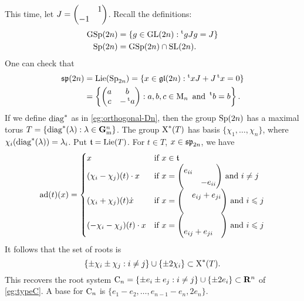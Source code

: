 \begin{example}[Symplectic]\label{eg:symplectic-root}
This time, let $J=\begin{pmatrix}  & 1 \\ -1 &  \end{pmatrix}$. Recall the definitions:
\begin{align*}
  \operatorname{GSp}(2n) &= \{g\in \operatorname{GL}(2n):\prescript{\mathrm{t}}{}{g} J g=J\} \\
  \operatorname{Sp}(2n) &= \operatorname{GSp}(2n)\cap \operatorname{SL}(2n) .
\end{align*}
One can check that 
\begin{align*}
  \mathfrak{sp}(2n)
    &= \operatorname{Lie}(\operatorname{Sp}_{2n}) = \{x\in \mathfrak{gl}(2n):\prescript{\mathrm{t}}{}{x} J + J\prescript{\mathrm{t}}{}{x}=0\} \\
    &= \left\{\begin{pmatrix} a & b \\ c & -\prescript{\mathrm{t}}{}{a} \end{pmatrix}:a,b,c\in \operatorname{M}_n\text{ and }\prescript{\mathrm{t}}{}{b}=b\right\} .
\end{align*}
If we define $\operatorname{diag}^\ast$ as in \autoref{eg:orthogonal-Dn}, then the group 
$\operatorname{Sp}(2n)$ has a maximal torus 
$T = \{\operatorname{diag}^\ast(\lambda):\lambda\in \mathbf{G}_\mathrm{m}^n\}$. The group 
$\operatorname{X}^\ast(T)$ has basis $\{\chi_1,\dots,\chi_n\}$, where 
$\chi_i(\operatorname{diag}^\ast(\lambda))=\lambda_i$. Put $\mathfrak{t}=\operatorname{Lie}(T)$. For 
$t\in T$, $x\in \mathfrak{sp}_{2n}$, we have 
\[
  \operatorname{ad}(t)(x) = 
  \begin{cases}
    x & \text{if $x\in \mathfrak{t}$} \\
    (\chi_i-\chi_j)(t)\cdot x & \text{if $x=\begin{pmatrix} e_{ii} &  \\  & -e_{ii} \end{pmatrix}$ and $i\ne j$} \\
    (\chi_i+\chi_j)(t)\dot x & \text{if $x=\begin{pmatrix}  & e_{i j}+e_{j i} \\  &  \end{pmatrix}$ and $i\leqslant j$} \\
    (-\chi_i-\chi_j)(t)\cdot x& \text{if $x=\begin{pmatrix}  &  \\ e_{i j}+e_{j i} &  \end{pmatrix}$ and $i\leqslant j$}
  \end{cases}
\]
It follows that the set of roots is
\[
  \{\pm \chi_i\pm \chi_j:i\ne j\}\cup\{\pm 2\chi_i\}\subset \operatorname{X}^\ast(T) .
\]
This recovers the root system
$\mathrm{C}_n = \{\pm e_i\pm e_j:i\ne j\}\cup \{\pm 2 e_i\}\subset \mathbf{R}^n$ of 
\autoref{eg:typeC}. A base for $\mathrm{C}_n$ is
$\{e_1-e_2,\dots,e_{n-1}-e_n,2 e_n\}$.
\end{example}

